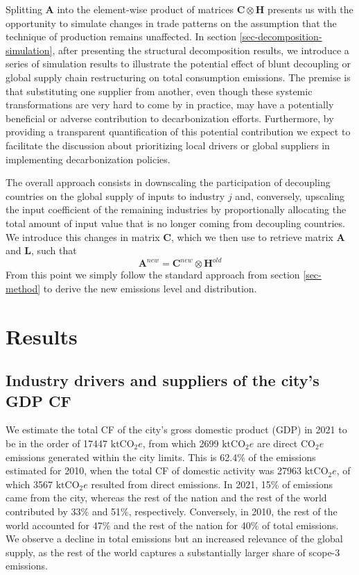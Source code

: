 \documentclass[
  10pt,
  twocolumn]{aft}
\begin{document}
Splitting \(\mathbf{A}\) into the element-wise product of matrices
\(\mathbf{C} \otimes \mathbf{H}\) presents us with the opportunity to
simulate changes in trade patterns on the assumption that the technique
of production remains unaffected. In section
\ref{sec-decomposition-simulation}, after presenting the structural
decomposition results, we introduce a series of simulation results to
illustrate the potential effect of blunt decoupling or global supply
chain restructuring on total consumption emissions. The premise is that
substituting one supplier from another, even though these systemic
transformations are very hard to come by in practice, may have a
potentially beneficial or adverse contribution to decarbonization
efforts. Furthermore, by providing a transparent quantification of this
potential contribution we expect to facilitate the discussion about
prioritizing local drivers or global suppliers in implementing
decarbonization policies.

The overall approach consists in downscaling the participation of
decoupling countries on the global supply of inputs to industry \(j\)
and, conversely, upscaling the input coefficient of the remaining
industries by proportionally allocating the total amount of input value
that is no longer coming from decoupling countries. We introduce this
changes in matrix \(\mathbf{C}\), which we then use to retrieve matrix
\(\mathbf{A}\) and \(\mathbf{L}\), such that \vspace{-3pt} \[
\mathbf{A}^{new}=\mathbf{C}^{new} \otimes \mathbf{H}^{old}
\] From this point we simply follow the standard approach from section
\ref{sec-method} to derive the new emissions level and distribution.

\section{Results}\label{sec-results}

\subsection{Industry drivers and suppliers of the city's GDP
CF}\label{sec-subsec-results-gdp}

We estimate the total CF of the city's gross domestic product (GDP) in
2021 to be in the order of 17447 \(\text{ktCO}_2e\), from which 2699
\(\text{ktCO}_2e\) are direct \(\text{CO}_2e\) emissions generated
within the city limits. This is 62.4\% of the emissions estimated for
2010, when the total CF of domestic activity was 27963
\(\text{ktCO}_2e\), of which 3567 \(\text{ktCO}_2e\) resulted from
direct emissions. In 2021, 15\% of emissions came from the city, whereas
the rest of the nation and the rest of the world contributed by 33\% and
51\%, respectively. Conversely, in 2010, the rest of the world accounted
for 47\% and the rest of the nation for 40\% of total emissions. We
observe a decline in total emissions but an increased relevance of the
global supply, as the rest of the world captures a substantially larger
share of scope-3 emissions.
\end{document}
